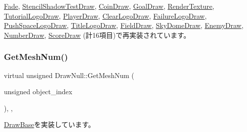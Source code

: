 \mbox{\hyperlink{class_fade_a6aed6912ebf9c243c52cb82f298d8d64}{Fade}}, \mbox{\hyperlink{class_stencil_shadow_test_draw_adfa99798c61ac13f209dc99f1e2694c5}{Stencil\+Shadow\+Test\+Draw}}, \mbox{\hyperlink{class_coin_draw_a8f5fd8668a4c66fe31446cc6f7c4afd7}{Coin\+Draw}}, \mbox{\hyperlink{class_goal_draw_a50fa9ceaaecdff9910e0f91e65ad9e95}{Goal\+Draw}}, \mbox{\hyperlink{class_render_texture_a0e9746f5cebdd088f2303e18cbc52eae}{Render\+Texture}}, \mbox{\hyperlink{class_tutorial_logo_draw_ab700e592d00574dff6ee342138343d7b}{Tutorial\+Logo\+Draw}}, \mbox{\hyperlink{class_player_draw_a8edf1441ea23f298c6a0ca707f54021a}{Player\+Draw}}, \mbox{\hyperlink{class_clear_logo_draw_af5d12b717020101e5c956cf3574f0e2a}{Clear\+Logo\+Draw}}, \mbox{\hyperlink{class_failure_logo_draw_aefc4be9e6ead4d90a5fc9c22cc07fe92}{Failure\+Logo\+Draw}}, \mbox{\hyperlink{class_push_space_logo_draw_a1ab6229ba2d68b730797f5016c99f359}{Push\+Space\+Logo\+Draw}}, \mbox{\hyperlink{class_title_logo_draw_af21cd1dbd79c741a2e3ca2b8e26c5f61}{Title\+Logo\+Draw}}, \mbox{\hyperlink{class_field_draw_a2629b4c4cd8e240e39c65b879c6e82b6}{Field\+Draw}}, \mbox{\hyperlink{class_sky_dome_draw_ab947a3d43975a6d95149bc112c08ce05}{Sky\+Dome\+Draw}}, \mbox{\hyperlink{class_enemy_draw_a6f2a052a45caf0d255112cbe81b8bfa3}{Enemy\+Draw}}, \mbox{\hyperlink{class_number_draw_a78f50afa05e728811d89a491f5eec899}{Number\+Draw}}, \mbox{\hyperlink{class_score_draw_a62aa20ef4b40544bf0a95770b925c780}{Score\+Draw}} (計16項目)で再実装されています。

\mbox{\label{class_draw_null_ad735978a85a5f3583eecd82d6bfe6413}} 
\subsubsection{\texorpdfstring{Get\+Mesh\+Num()}{GetMeshNum()}}
{\footnotesize\ttfamily virtual unsigned Draw\+Null\+::\+Get\+Mesh\+Num (\begin{DoxyParamCaption}\item[{unsigned}]{object\+\_\+index }\end{DoxyParamCaption})\hspace{0.3cm}{\ttfamily [inline]}, {\ttfamily [override]}, {\ttfamily [virtual]}}



\mbox{\hyperlink{class_draw_base_a194eb48924f205d60d4e63c5becdd2fe}{Draw\+Base}}を実装しています。



